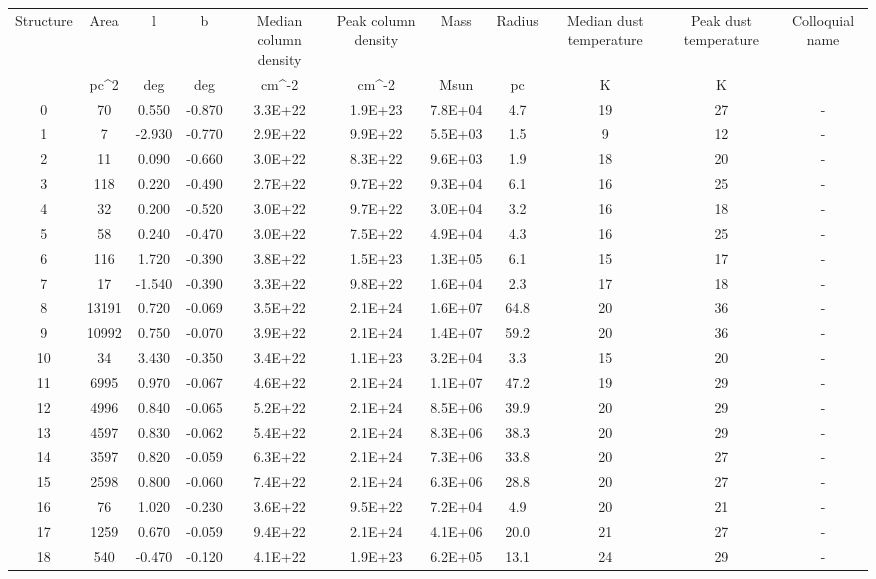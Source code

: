 \begin{tabular}{ccccccccccc}
Structure & Area & l & b & Median column density & Peak column density & Mass & Radius & Median dust temperature & Peak dust temperature & Colloquial name\\
& pc^2 & deg & deg & cm^-2 & cm^-2 & Msun & pc & K & K & \\
0 & 70 & 0.550 & -0.870 & 3.3E+22 & 1.9E+23 & 7.8E+04 & 4.7 & 19 & 27 & - \\
1 & 7 & -2.930 & -0.770 & 2.9E+22 & 9.9E+22 & 5.5E+03 & 1.5 & 9 & 12 & - \\
2 & 11 & 0.090 & -0.660 & 3.0E+22 & 8.3E+22 & 9.6E+03 & 1.9 & 18 & 20 & - \\
3 & 118 & 0.220 & -0.490 & 2.7E+22 & 9.7E+22 & 9.3E+04 & 6.1 & 16 & 25 & - \\
4 & 32 & 0.200 & -0.520 & 3.0E+22 & 9.7E+22 & 3.0E+04 & 3.2 & 16 & 18 & - \\
5 & 58 & 0.240 & -0.470 & 3.0E+22 & 7.5E+22 & 4.9E+04 & 4.3 & 16 & 25 & - \\
6 & 116 & 1.720 & -0.390 & 3.8E+22 & 1.5E+23 & 1.3E+05 & 6.1 & 15 & 17 & - \\
7 & 17 & -1.540 & -0.390 & 3.3E+22 & 9.8E+22 & 1.6E+04 & 2.3 & 17 & 18 & - \\
8 & 13191 & 0.720 & -0.069 & 3.5E+22 & 2.1E+24 & 1.6E+07 & 64.8 & 20 & 36 & - \\
9 & 10992 & 0.750 & -0.070 & 3.9E+22 & 2.1E+24 & 1.4E+07 & 59.2 & 20 & 36 & - \\
10 & 34 & 3.430 & -0.350 & 3.4E+22 & 1.1E+23 & 3.2E+04 & 3.3 & 15 & 20 & - \\
11 & 6995 & 0.970 & -0.067 & 4.6E+22 & 2.1E+24 & 1.1E+07 & 47.2 & 19 & 29 & - \\
12 & 4996 & 0.840 & -0.065 & 5.2E+22 & 2.1E+24 & 8.5E+06 & 39.9 & 20 & 29 & - \\
13 & 4597 & 0.830 & -0.062 & 5.4E+22 & 2.1E+24 & 8.3E+06 & 38.3 & 20 & 29 & - \\
14 & 3597 & 0.820 & -0.059 & 6.3E+22 & 2.1E+24 & 7.3E+06 & 33.8 & 20 & 27 & - \\
15 & 2598 & 0.800 & -0.060 & 7.4E+22 & 2.1E+24 & 6.3E+06 & 28.8 & 20 & 27 & - \\
16 & 76 & 1.020 & -0.230 & 3.6E+22 & 9.5E+22 & 7.2E+04 & 4.9 & 20 & 21 & - \\
17 & 1259 & 0.670 & -0.059 & 9.4E+22 & 2.1E+24 & 4.1E+06 & 20.0 & 21 & 27 & - \\
18 & 540 & -0.470 & -0.120 & 4.1E+22 & 1.9E+23 & 6.2E+05 & 13.1 & 24 & 29 & - \\

\end{tabular}
